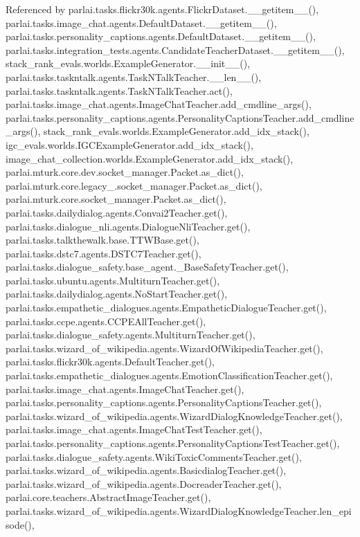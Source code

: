 Referenced by parlai.\+tasks.\+flickr30k.\+agents.\+Flickr\+Dataset.\+\_\+\+\_\+getitem\+\_\+\+\_\+(), parlai.\+tasks.\+image\+\_\+chat.\+agents.\+Default\+Dataset.\+\_\+\+\_\+getitem\+\_\+\+\_\+(), parlai.\+tasks.\+personality\+\_\+captions.\+agents.\+Default\+Dataset.\+\_\+\+\_\+getitem\+\_\+\+\_\+(), parlai.\+tasks.\+integration\+\_\+tests.\+agents.\+Candidate\+Teacher\+Dataset.\+\_\+\+\_\+getitem\+\_\+\+\_\+(), stack\+\_\+rank\+\_\+evals.\+worlds.\+Example\+Generator.\+\_\+\+\_\+init\+\_\+\+\_\+(), parlai.\+tasks.\+taskntalk.\+agents.\+Task\+N\+Talk\+Teacher.\+\_\+\+\_\+len\+\_\+\+\_\+(), parlai.\+tasks.\+taskntalk.\+agents.\+Task\+N\+Talk\+Teacher.\+act(), parlai.\+tasks.\+image\+\_\+chat.\+agents.\+Image\+Chat\+Teacher.\+add\+\_\+cmdline\+\_\+args(), parlai.\+tasks.\+personality\+\_\+captions.\+agents.\+Personality\+Captions\+Teacher.\+add\+\_\+cmdline\+\_\+args(), stack\+\_\+rank\+\_\+evals.\+worlds.\+Example\+Generator.\+add\+\_\+idx\+\_\+stack(), igc\+\_\+evals.\+worlds.\+I\+G\+C\+Example\+Generator.\+add\+\_\+idx\+\_\+stack(), image\+\_\+chat\+\_\+collection.\+worlds.\+Example\+Generator.\+add\+\_\+idx\+\_\+stack(), parlai.\+mturk.\+core.\+dev.\+socket\+\_\+manager.\+Packet.\+as\+\_\+dict(), parlai.\+mturk.\+core.\+legacy\+\_.\+socket\+\_\+manager.\+Packet.\+as\+\_\+dict(), parlai.\+mturk.\+core.\+socket\+\_\+manager.\+Packet.\+as\+\_\+dict(), parlai.\+tasks.\+dailydialog.\+agents.\+Convai2\+Teacher.\+get(), parlai.\+tasks.\+dialogue\+\_\+nli.\+agents.\+Dialogue\+Nli\+Teacher.\+get(), parlai.\+tasks.\+talkthewalk.\+base.\+T\+T\+W\+Base.\+get(), parlai.\+tasks.\+dstc7.\+agents.\+D\+S\+T\+C7\+Teacher.\+get(), parlai.\+tasks.\+dialogue\+\_\+safety.\+base\+\_\+agent.\+\_\+\+Base\+Safety\+Teacher.\+get(), parlai.\+tasks.\+ubuntu.\+agents.\+Multiturn\+Teacher.\+get(), parlai.\+tasks.\+dailydialog.\+agents.\+No\+Start\+Teacher.\+get(), parlai.\+tasks.\+empathetic\+\_\+dialogues.\+agents.\+Empathetic\+Dialogue\+Teacher.\+get(), parlai.\+tasks.\+ccpe.\+agents.\+C\+C\+P\+E\+All\+Teacher.\+get(), parlai.\+tasks.\+dialogue\+\_\+safety.\+agents.\+Multiturn\+Teacher.\+get(), parlai.\+tasks.\+wizard\+\_\+of\+\_\+wikipedia.\+agents.\+Wizard\+Of\+Wikipedia\+Teacher.\+get(), parlai.\+tasks.\+flickr30k.\+agents.\+Default\+Teacher.\+get(), parlai.\+tasks.\+empathetic\+\_\+dialogues.\+agents.\+Emotion\+Classification\+Teacher.\+get(), parlai.\+tasks.\+image\+\_\+chat.\+agents.\+Image\+Chat\+Teacher.\+get(), parlai.\+tasks.\+personality\+\_\+captions.\+agents.\+Personality\+Captions\+Teacher.\+get(), parlai.\+tasks.\+wizard\+\_\+of\+\_\+wikipedia.\+agents.\+Wizard\+Dialog\+Knowledge\+Teacher.\+get(), parlai.\+tasks.\+image\+\_\+chat.\+agents.\+Image\+Chat\+Test\+Teacher.\+get(), parlai.\+tasks.\+personality\+\_\+captions.\+agents.\+Personality\+Captions\+Test\+Teacher.\+get(), parlai.\+tasks.\+dialogue\+\_\+safety.\+agents.\+Wiki\+Toxic\+Comments\+Teacher.\+get(), parlai.\+tasks.\+wizard\+\_\+of\+\_\+wikipedia.\+agents.\+Basicdialog\+Teacher.\+get(), parlai.\+tasks.\+wizard\+\_\+of\+\_\+wikipedia.\+agents.\+Docreader\+Teacher.\+get(), parlai.\+core.\+teachers.\+Abstract\+Image\+Teacher.\+get(), parlai.\+tasks.\+wizard\+\_\+of\+\_\+wikipedia.\+agents.\+Wizard\+Dialog\+Knowledge\+Teacher.\+len\+\_\+episode(), 